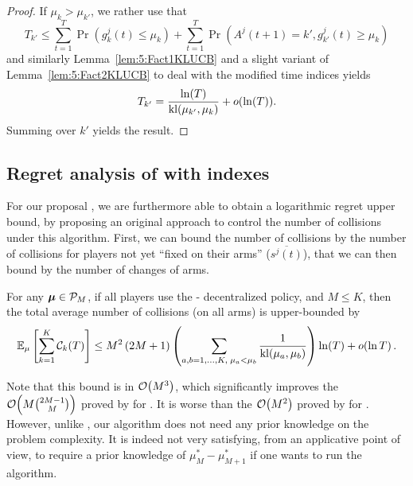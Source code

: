 \begin{proof}
  If $\mu_k > \mu_{k'}$, we rather use that
  \[T_{k'} \leq \sum_{t=1}^T \Pr\left(g_{k}^j(t) \leq \mu_{k}\right) + \sum_{t=1}^T \Pr\left(A^j(t+1) = k', g_{k'}^j(t) \geq \mu_{k}\right)\]
  and similarly Lemma~\ref{lem:5:Fact1KLUCB} and a slight variant of Lemma~\ref{lem:5:Fact2KLUCB} to deal with the modified time indices yields
  \[T_{k'} = \frac{\ln(T)}{\mathrm{kl}(\mu_{k'},\mu_{k})} + o(\ln(T)).\]
  Summing over $k'$ yields the result.
\end{proof}


\subsection{Regret analysis of \MCTopM{} with \klUCB{} indexes}\label{sub:5:UpperBoundCollisions}

For our proposal \MCTopM, we are furthermore able to obtain a logarithmic regret upper bound, by proposing an original approach to control the number of collisions under this algorithm.
First, we can bound the number of collisions by the number of collisions for players not yet ``fixed on their arms'' ($\overline{s^j(t)}$),
that we can then bound by the number of changes of arms.

\begin{lemma}\label{lem:5:collisionsMCTopM}
\begin{leftbar}[lemmabar]  %
  For any $\boldsymbol{\mu}\in\mathcal{P}_M$,
  if all players use the
  \MCTopM-\klUCB{} decentralized policy,
  and $M \leq K$,
  then the total average number of collisions (on all arms)
  is upper-bounded by
  \begin{equation}
    \mathbb{E}_{\mu}\left[\sum_{k=1}^K \mathcal{C}_k(T)\right]
    \leq M^2\left(2 M + 1\right) \left(\sum_{a,b=1,\dots,K,\;\mu_a < \mu_b} \frac{1}{\mathrm{kl}(\mu_a,\mu_b)}\right) \ln(T) + \mathop{}\mathopen{}o\mathopen{}\left(\ln T\right).
  \end{equation}
\end{leftbar}  %
\end{lemma}

Note that this bound is in $\mathop{}\mathopen{}\mathcal{O}\mathopen{}\left(M^3\right)$,
which significantly improves the $\mathop{}\mathopen{}\mathcal{O}\mathopen{}\left(M{2M-1 \choose M}\right)$ proved by \cite{Anandkumar11} for \rhoRand. It is worse than the $\mathop{}\mathopen{}\mathcal{O}\mathopen{}\left(M^2\right)$ proved by \cite{Rosenski16} for \MusicalChair{}. %
However, unlike \MusicalChair, our algorithm does not need any prior knowledge on the problem complexity.
It is indeed not very satisfying, from an applicative point of view, to require a prior knowledge
of $\mu^*_{M}-\mu^*_{M+1}$ if one wants to run the \MusicalChair{} algorithm.


